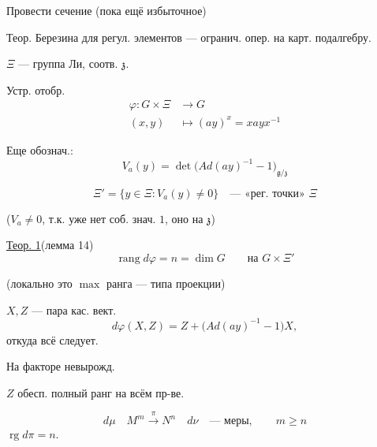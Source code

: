 \clearpage

Провести сечение (пока ещё избыточное)

Теор. Березина для регул. элементов — огранич. опер.
на карт. подалгебру.



$\Xi$ — группа Ли, соотв. $\mathfrak z$.



Устр. отобр.
\begin{align*}
\varphi\colon G\times\Xi&\longrightarrow G\\
(x,y)&\longmapsto (ay)^x=xayx^{-1}
\end{align*}



Еще обознач.:
\begin{equation*}
V_a(y)=\det\bigl(Ad(ay)^{-1}-1\bigr)_{\mathfrak g/\mathfrak z}
\end{equation*}



\begin{equation*}
\Xi'=\{y\in\Xi:V_a(y)\ne0\}\quad\text{— «рег. точки» }\Xi
\end{equation*}



($V_a\ne0$, т.к. уже нет соб. знач. $1$, оно на $\mathfrak z$)



\underline{Теор. 1}\quad (лемма 14)
\begin{equation*}
\operatorname{rang}d\varphi=n=\dim G\qquad\text{на }G\times\Xi'
\end{equation*}



(локально это $\max$ ранга — типа проекции)



 $X,Z$ — пара кас. вект.
\begin{equation*}
d\varphi(X,Z)=Z+\bigl(Ad(ay)^{-1}-1\bigr)X,
\end{equation*}
откуда всё следует.



На факторе невырожд.

$Z$ обесп. полный ранг на всём пр-ве.



\begin{equation*}
d\mu\quad M^m\overset{\pi}{\longrightarrow}N^n\quad d\nu
\quad\text{— меры},\qquad m\ge n
\end{equation*}
$\operatorname{rg}d\pi=n$.



